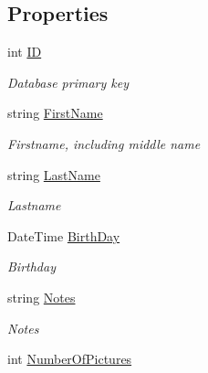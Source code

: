 \subsection*{Properties}
\begin{DoxyCompactItemize}
\item 
int \mbox{\hyperlink{class_pic_d_b_1_1_models_1_1_photographer_view_model_ae87e68bc56789ebae82f20687b6cca57}{ID}}
\begin{DoxyCompactList}\small\item\em Database primary key \end{DoxyCompactList}\item 
string \mbox{\hyperlink{class_pic_d_b_1_1_models_1_1_photographer_view_model_ad613f0e82e13a6b319f960eab80a6119}{First\+Name}}
\begin{DoxyCompactList}\small\item\em Firstname, including middle name \end{DoxyCompactList}\item 
string \mbox{\hyperlink{class_pic_d_b_1_1_models_1_1_photographer_view_model_ad3eec5ba41d5da7ba316c19fbf0e8fee}{Last\+Name}}
\begin{DoxyCompactList}\small\item\em Lastname \end{DoxyCompactList}\item 
Date\+Time \mbox{\hyperlink{class_pic_d_b_1_1_models_1_1_photographer_view_model_ada37c319eff23f8b0c039e0d06b520b9}{Birth\+Day}}
\begin{DoxyCompactList}\small\item\em Birthday \end{DoxyCompactList}\item 
string \mbox{\hyperlink{class_pic_d_b_1_1_models_1_1_photographer_view_model_a2f227a254615cfd15fca6978f4aed942}{Notes}}
\begin{DoxyCompactList}\small\item\em Notes \end{DoxyCompactList}\item 
int \mbox{\hyperlink{class_pic_d_b_1_1_models_1_1_photographer_view_model_a1fee5d2afa05933a79ab26cae3b2d009}{Number\+Of\+Pictures}}

\end{DoxyCompactItemize}
